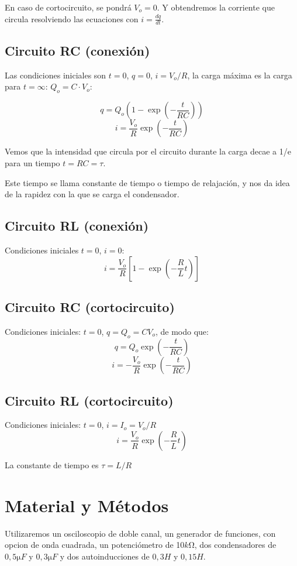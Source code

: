 \documentclass[a4paper,12pt,spanish]{article}
\begin{document}
En caso de cortocircuito, se pondrá $V_o = 0$. Y obtendremos la corriente que circula resolviendo las ecuaciones con $i=\frac{dq}{dt}$.

\subsection*{Circuito RC (conexión)}

Las condiciones iniciales son $t= 0$, $q= 0$, $i = V_o/R$, la carga máxima es la carga para $t= \infty$: $Q_o = C \cdot V_o $:

\[ q= Q_o \left(1 - \exp\left( -\frac{t}{RC} \right)\right)\]
\[i = \frac{V_o}{R} \exp\left( -\frac{t}{RC} \right)\]

Vemos que la intensidad que circula por el circuito durante la carga decae a 1/e para un tiempo $t= RC = \tau$. 

Este tiempo se llama constante de tiempo o tiempo de relajación, y nos da idea de la rapidez con la que se carga el condensador.

\subsection*{Circuito RL (conexión)}

Condiciones iniciales $t= 0$, $i = 0$:
\[ i= \frac{V_o}{R}\left[1 - \exp\left(-\frac{R}{L}t\right)\right] \]


\subsection*{Circuito RC (cortocircuito)}

Condiciones iniciales: $t= 0$, $q= Q_o = CV_o$, de modo que:
\[q = Q_o \exp\left(-\frac{t}{RC}\right)\]
\[i = - \frac{V_o}{R} \exp \left(- \frac{t}{RC}\right)\]

\subsection*{Circuito RL (cortocircuito)}

Condiciones iniciales: $t= 0$, $i= I_o = V_o/R$
\[i = \frac{V_o}{R}\exp\left(-\frac{R}{L}t\right)\]

La constante de tiempo es $\tau = L/R$

\section{Material y Métodos}

Utilizaremos un osciloscopio de doble canal, un generador de funciones, con opcion de onda cuadrada, un potenciómetro de 10$\si{k\ohm}$, dos condensadores de $0,5 \si{\micro F}$ y $0,3 \si{\micro F}$ y dos autoinducciones de $0,3 \si{H}$ y $0,15 \si{H}$.
\end{document}
